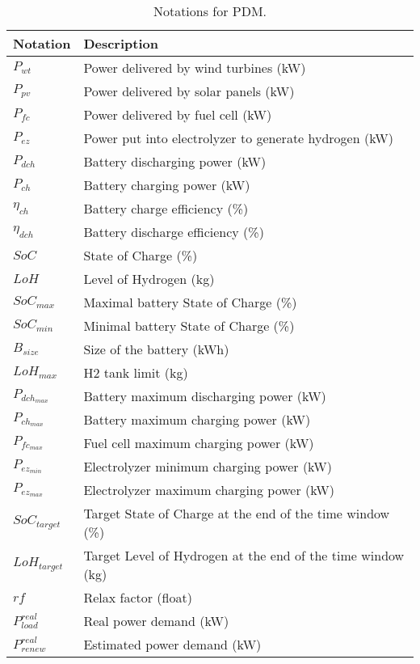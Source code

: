 \begin{table*}[!htb]
\centering
\caption{Notations for PDM.}
\label{tab:notation_power}
\begin{tabular}{l|l}
    \hline
    Notation & Description \\\hline\hline
    $P_{wt}$ & Power delivered by wind turbines (kW)\\
    $P_{pv}$ & Power delivered by solar panels (kW)\\
    $P_{fc}$ & Power delivered by fuel cell (kW)\\
    $P_{ez}$ & Power put into electrolyzer to generate hydrogen (kW)\\
    $P_{dch}$ & Battery discharging power (kW)\\
    $P_{ch}$ & Battery charging power (kW)\\
    $\eta_{ch}$ & Battery charge efficiency (\%)\\
    $\eta_{dch}$ & Battery discharge efficiency (\%)\\
    $SoC$ & State of Charge (\%)\\
    $LoH$ & Level of Hydrogen (kg)\\
    $SoC_{max}$ & Maximal battery State of Charge (\%)\\
    $SoC_{min}$ & Minimal battery State of Charge (\%)\\
    $B_{size}$ & Size of the battery (kWh)\\
    $LoH_{max}$ & H2 tank limit (kg)\\
    $P_{dch_{max}}$ & Battery maximum discharging power (kW)\\
    $P_{ch_{max}}$ & Battery maximum charging power (kW)\\
    $P_{fc_{max}}$ & Fuel cell maximum charging power (kW)\\
    $P_{ez_{min}}$ & Electrolyzer minimum charging power (kW)\\
    $P_{ez_{max}}$ & Electrolyzer maximum charging power (kW)\\
    $SoC_{target}$ & Target State of Charge at the end of the time window (\%)\\
    $LoH_{target}$ & Target Level of Hydrogen at the end of the time window (kg)\\
    $rf$ & Relax factor (float) \\
    $P^{real}_{load}$ & Real power demand (kW)\\
    $P^{real}_{renew}$ & Estimated power demand (kW)\\
    \hline
\end{tabular}
\end{table*}